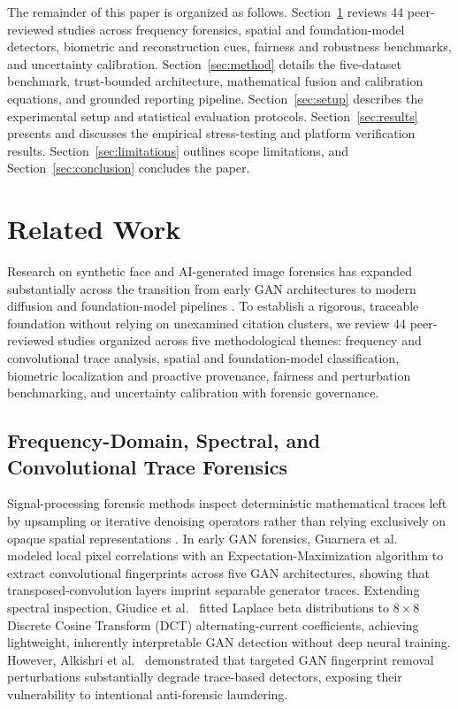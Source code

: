 \documentclass[final,5p,times,twocolumn,numafflabel]{elsarticle}
\begin{document}
The remainder of this paper is organized as follows. Section~\ref{sec:related} reviews 44 peer-reviewed studies across frequency forensics, spatial and foundation-model detectors, biometric and reconstruction cues, fairness and robustness benchmarks, and uncertainty calibration. Section~\ref{sec:method} details the five-dataset benchmark, trust-bounded architecture, mathematical fusion and calibration equations, and grounded reporting pipeline. Section~\ref{sec:setup} describes the experimental setup and statistical evaluation protocols. Section~\ref{sec:results} presents and discusses the empirical stress-testing and platform verification results. Section~\ref{sec:limitations} outlines scope limitations, and Section~\ref{sec:conclusion} concludes the paper.

\section{Related Work}
\label{sec:related}

Research on synthetic face and AI-generated image forensics has expanded substantially across the transition from early GAN architectures to modern diffusion and foundation-model pipelines \cite{Croitoru_2026}. To establish a rigorous, traceable foundation without relying on unexamined citation clusters, we review 44 peer-reviewed studies organized across five methodological themes: frequency and convolutional trace analysis, spatial and foundation-model classification, biometric localization and proactive provenance, fairness and perturbation benchmarking, and uncertainty calibration with forensic governance.

\subsection{Frequency-Domain, Spectral, and Convolutional Trace Forensics}

Signal-processing forensic methods inspect deterministic mathematical traces left by upsampling or iterative denoising operators rather than relying exclusively on opaque spatial representations \cite{Gragnaniello_2022}. In early GAN forensics, Guarnera et al.\ \cite{Guarnera_2020} modeled local pixel correlations with an Expectation-Maximization algorithm to extract convolutional fingerprints across five GAN architectures, showing that transposed-convolution layers imprint separable generator traces. Extending spectral inspection, Giudice et al.\ \cite{Giudice_2021} fitted Laplace beta distributions to $8\times 8$ Discrete Cosine Transform (DCT) alternating-current coefficients, achieving lightweight, inherently interpretable GAN detection without deep neural training. However, Alkishri et al.\ \cite{Alkishri_2024} demonstrated that targeted GAN fingerprint removal perturbations substantially degrade trace-based detectors, exposing their vulnerability to intentional anti-forensic laundering.
\end{document}
